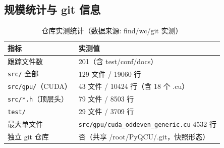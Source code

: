 \documentclass[UTF8]{ctexart}
\begin{document}
\subsection{规模统计与 git 信息}
\begin{table}[htbp]\centering
\begin{tabular}{ll}
\toprule
指标 & 实测值 \\
\midrule
跟踪文件数 & 201（含 test/conf/docs） \\
\texttt{src/} 全部 & 129 文件 / 19060 行 \\
\texttt{src/gpu/}（CUDA） & 43 文件 / 10424 行（含 18 个 .cu） \\
\texttt{src/*.h}（顶层头） & 79 文件 / 8503 行 \\
\texttt{test/} & 29 文件 / 3709 行 \\
最大单文件 & \texttt{src/gpu/cuda\_oddeven\_generic.cu} 4532 行 \\
独立 git 仓库 & 否（共享 /root/PyQCU/.git，快照形态） \\
\bottomrule
\end{tabular}
\caption{仓库实测统计（数据来源: find/wc/git 实测）}
\end{table}
\end{document}
